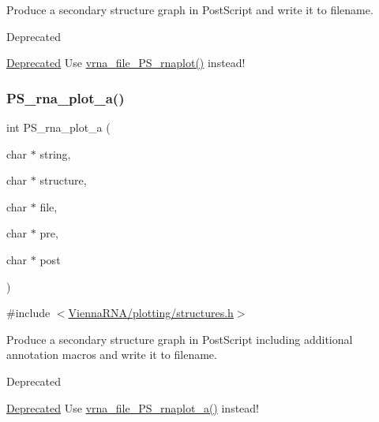 Produce a secondary structure graph in Post\+Script and write it to \textquotesingle{}filename\textquotesingle{}. 

\begin{DoxyRefDesc}{Deprecated}
\item[\mbox{\hyperlink{deprecated__deprecated000175}{Deprecated}}]Use \mbox{\hyperlink{group__plotting__utils_gabdc8f6548ba4a3bc3cd868ccbcfdb86a}{vrna\+\_\+file\+\_\+\+P\+S\+\_\+rnaplot()}} instead! \end{DoxyRefDesc}
\mbox{\label{group__plotting__utils_ga47856b2504b566588785597b6ebb8271}} 
\subsubsection{\texorpdfstring{PS\_rna\_plot\_a()}{PS\_rna\_plot\_a()}}
{\footnotesize\ttfamily int P\+S\+\_\+rna\+\_\+plot\+\_\+a (\begin{DoxyParamCaption}\item[{char $\ast$}]{string,  }\item[{char $\ast$}]{structure,  }\item[{char $\ast$}]{file,  }\item[{char $\ast$}]{pre,  }\item[{char $\ast$}]{post }\end{DoxyParamCaption})}



{\ttfamily \#include $<$\mbox{\hyperlink{plotting_2structures_8h}{Vienna\+R\+N\+A/plotting/structures.\+h}}$>$}



Produce a secondary structure graph in Post\+Script including additional annotation macros and write it to \textquotesingle{}filename\textquotesingle{}. 

\begin{DoxyRefDesc}{Deprecated}
\item[\mbox{\hyperlink{deprecated__deprecated000176}{Deprecated}}]Use \mbox{\hyperlink{group__plotting__utils_ga139a31dd0ba9fc6612431f67de901c31}{vrna\+\_\+file\+\_\+\+P\+S\+\_\+rnaplot\+\_\+a()}} instead! \end{DoxyRefDesc}
\mbox{\label{group__plotting__utils_ga32fa0f97625119e9d24dd2e7153abc4f}} 
